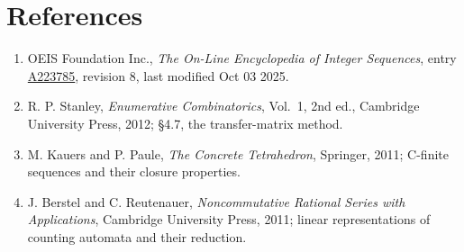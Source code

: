 \documentclass[11pt]{article}
\theoremstyle{definition}
\begin{document}
\section{References}

\begin{enumerate}

\item OEIS Foundation Inc., \emph{The On-Line Encyclopedia of Integer Sequences}, entry \href{https://oeis.org/A223785}{A223785}, revision 8, last modified Oct 03 2025.

\item R. P. Stanley, \emph{Enumerative Combinatorics}, Vol.~1, 2nd ed., Cambridge University Press, 2012; \S4.7, the transfer-matrix method.

\item M. Kauers and P. Paule, \emph{The Concrete Tetrahedron}, Springer, 2011; C-finite sequences and their closure properties.

\item J. Berstel and C. Reutenauer, \emph{Noncommutative Rational Series with Applications}, Cambridge University Press, 2011; linear representations of counting automata and their reduction.

\end{enumerate}
\end{document}
